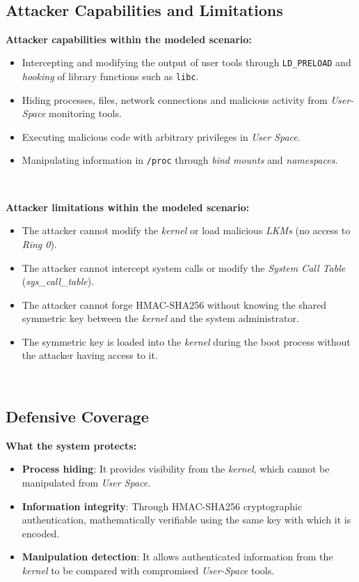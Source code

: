 \

\subsection{Attacker Capabilities and Limitations}

\textbf{Attacker capabilities within the modeled scenario:}

\begin{itemize}
    \item Intercepting and modifying the output of user tools through \texttt{LD\_PRELOAD} and \textit{hooking} of library functions such as \texttt{libc}.
    \item Hiding processes, files, network connections and malicious activity from \textit{User-Space} monitoring tools.
    \item Executing malicious code with arbitrary privileges in \textit{User Space}.
    \item Manipulating information in \texttt{/proc} through \textit{bind mounts} and \textit{namespaces}.
\end{itemize}

\

\textbf{Attacker limitations within the modeled scenario:}

\begin{itemize}
    \item The attacker cannot modify the \textit{kernel} or load malicious \textit{LKMs} (no access to \textit{Ring 0}).
    \item The attacker cannot intercept system calls or modify the \textit{System Call Table} (\textit{sys\_call\_table}).
    \item The attacker cannot forge HMAC-SHA256 without knowing the shared symmetric key between the \textit{kernel} and the system administrator.
    \item The symmetric key is loaded into the \textit{kernel} during the boot process without the attacker having access to it.
\end{itemize}

\

\subsection{Defensive Coverage}

\textbf{What the system protects:}

\begin{itemize}
    \item \textbf{Process hiding}: It provides visibility from the \textit{kernel}, which cannot be manipulated from \textit{User Space}.
    \item \textbf{Information integrity}: Through HMAC-SHA256 cryptographic authentication, mathematically verifiable using the same key with which it is encoded.
    \item \textbf{Manipulation detection}: It allows authenticated information from the \textit{kernel} to be compared with compromised \textit{User-Space} tools.
\end{itemize}

